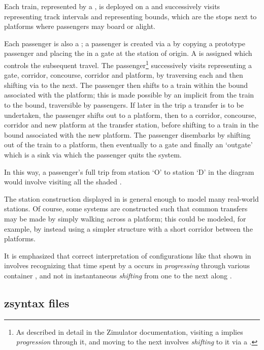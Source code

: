 Each train, represented by a , is deployed on a  and
successively visits  representing track intervals and representing bounds,
which are the stops next to platforms where passengers may board or alight.

Each passenger is also a ; a passenger is created via a
 by copying a prototype passenger and placing the
 in a gate at the station of origin. A  is
assigned which controls the subsequent travel. The
passenger\footnote{As described in detail in the Zimulator
  documentation, visiting a  implies \emph{progression}
  through it, and moving to the next  involves
  \emph{shifting} to it via a .}  successively visits
 representing a gate, corridor, concourse, corridor and
platform, by traversing each and then shifting via  to the
next. The passenger then shifts to a train within the bound
 associated with the platform; this is made possible
by an implicit  from the train to the bound, traversible by passengers.
If later in the trip a transfer is to be undertaken, the passenger
shifts out to a platform, then to a corridor, concourse, corridor and
new platform at the transfer station, before shifting to a train in
the bound associated with the new platform. The passenger disembarks
by shifting out of the train to a platform, then eventually to a gate
and finally an `outgate' which is a sink via which the passenger quits
the system.

In this way, a passenger's full trip from station `O' to station `D' in the diagram
would involve visiting all the shaded .

The station construction displayed in  is general enough to
model many real-world stations.  Of course, some systems are
constructed such that common transfers may be made by simply walking
across a platform; this could be modeled, for example, by instead using
a simpler structure with a short corridor  between the platforms.

It is emphasized that correct interpretation of configurations like that shown in 
involves recognizing that time spent by a  occurs in \emph{progressing}
through various container , and not in instantaneous \emph{shifting}
from one to the next along .

\subsection{zsyntax files}
\label{seczsyn}

